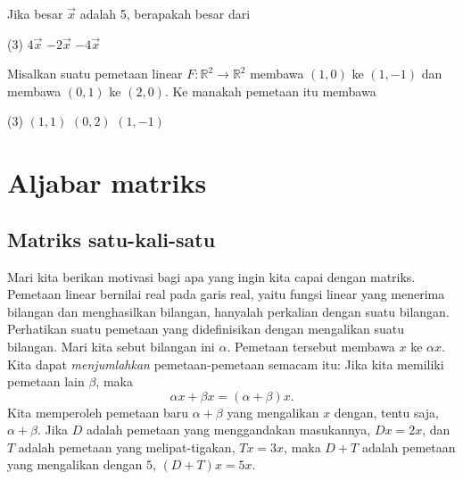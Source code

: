 \begin{exercise}
Jika besar $\vec{x}$ adalah 5, berapakah besar dari
\begin{tasks}(3)
\task
$4\vec{x}$
\task
$-2\vec{x}$
\task
$-4\vec{x}$
\end{tasks}
\end{exercise}

\begin{exercise}
Misalkan suatu pemetaan linear $F \colon {\mathbb R}^2 \to {\mathbb R}^2$
membawa $(1,0)$ ke $(1,-1)$ dan membawa $(0,1)$ ke $(2,0)$.
Ke manakah pemetaan itu membawa
\begin{tasks}(3)
\task
$(1,1)$
\task
$(0,2)$
\task
$(1,-1)$
\end{tasks}
\end{exercise}


\sectionnewpage
\section{Aljabar matriks}
\label{matalg:section}



\subsection{Matriks satu-kali-satu}

Mari kita berikan motivasi bagi apa yang ingin kita capai dengan matriks.
Pemetaan linear bernilai real pada garis real, yaitu fungsi linear
yang menerima bilangan dan menghasilkan bilangan, hanyalah perkalian dengan suatu
bilangan. Perhatikan suatu pemetaan yang didefinisikan dengan mengalikan suatu
bilangan. Mari kita sebut bilangan ini $\alpha$. Pemetaan tersebut membawa $x$ ke
$\alpha x$. Kita dapat
\emph{menjumlahkan} pemetaan-pemetaan semacam itu:
Jika kita memiliki pemetaan lain $\beta$, maka
\begin{equation*}
\alpha x + \beta x = (\alpha + \beta) x .
\end{equation*}
Kita memperoleh pemetaan baru $\alpha+\beta$ yang mengalikan $x$ dengan, tentu saja,
$\alpha+\beta$. Jika $D$ adalah pemetaan yang menggandakan masukannya,
$Dx = 2x$, dan $T$ adalah pemetaan yang melipat-tigakan, $Tx = 3x$, maka
$D+T$ adalah pemetaan yang mengalikan dengan $5$, $(D+T)x = 5x$.

